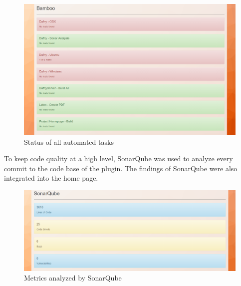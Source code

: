 \begin{figure}[H]
	\centering
	\includegraphics[width=1\textwidth]{img/homeBuilds}
	\caption{Status of all automated tasks}
	\label{fig:Bamboo Tasks}
\end{figure}
To keep code quality at a high level, SonarQube was used to analyze every commit to the code base of the plugin. The findings of SonarQube were also integrated into the home page. \newline
\begin{figure}[H]
	\centering
	\includegraphics[width=1\textwidth]{img/homeSonar}
	\caption{Metrics analyzed by SonarQube}
	\label{fig:SonarQube}
\end{figure}

